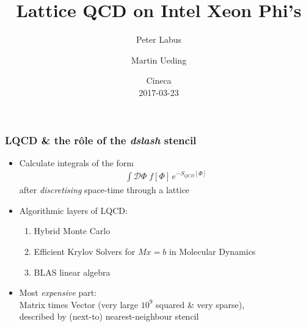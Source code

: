 \documentclass{beamer}
\begin{document}
\allowdisplaybreaks[1]

\title{Lattice QCD on Intel Xeon Phi's}
\author{Peter Labus \and Martin Ueding }
  \date{Cineca \\ 2017-03-23}


  \begin{frame}
    \titlepage
  \end{frame}


  \setcounter{framenumber}{0}

  \begin{frame}
    \frametitle{LQCD \& the r\^ole of the \textit{dslash} stencil}

    \begin{itemize}
      \item  Calculate integrals of the form
        \begin{align*}
          \int \mathcal D \Phi \; f[\Phi] \, e^{-S_{QCD}[\Phi]}
        \end{align*}
        after \textit{discretising} space-time through a lattice
        \vfill

      \item Algorithmic layers of LQCD:
        \begin{enumerate}
          \item Hybrid Monte Carlo
          \item Efficient Krylov Solvers for $Mx=b$ in Molecular Dynamics
          \item BLAS linear algebra
        \end{enumerate}
        \vfill

      \item Most \textit{expensive} part:\\[1mm]
        \hspace{2mm} Matrix times Vector (very large $10^9$ squared \& very sparse),\\
        \hspace{2mm} described by (next-to) nearest-neighbour stencil
        \vfill
    \end{itemize}

  \end{frame}

\end{document}
